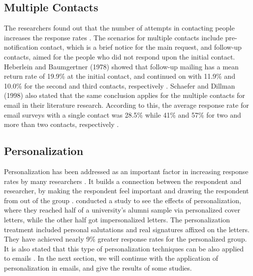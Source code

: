 \subsection{Multiple Contacts}
\label{sec:2.2.2:MultCont}
The researchers found out that the number of attempts in contacting people increases the response rates \citep{Heberlein1978,Schaefer1998}. The scenarios for multiple contacts include pre-notification contact, which is a brief notice for the main request, and follow-up contacts, aimed for the people who did not respond upon the initial contact. Heberlein and Baumgertner (1978) showed that follow-up mailing has a mean return rate of 19.9\% at the initial contact, and continued on with 11.9\% and 10.0\% for the second and third contacts, respectively \citep{Heberlein1978}. Schaefer and Dillman (1998) also stated that the same conclusion applies for the multiple contacts for email in their literature research. According to this, the average response rate for email surveys with a single contact was 28.5\% while 41\% and 57\% for two and more than two contacts, respectively \citep{Schaefer1998}.

\subsection{Personalization}
\label{sec:2.2.3:Pers}
Personalization has been addressed as an important factor in increasing response rates by many researchers \citep{Dillman1991,Schaefer1998}. It builds a connection between the respondent and researcher, by making the respondent feel important and drawing the respondent from out of the group \citep[page 272]{DillmanDonA.SmythJoleneD.Christian2009}. \cite{Dillman1974a} conducted a study to see the effects of personalization, where they reached half of a university's alumni sample via personalized cover letters, while the other half got impersonalized letters. The personalization treatment included personal salutations and real signatures affixed on the letters. They have achieved nearly 9\% greater response rates for the personalized group. It is also stated that this type of personalization techniques can be also applied to emails \citep{Schaefer1998}. In the next section, we will continue with the application of personalization in emails, and give the results of some studies.

